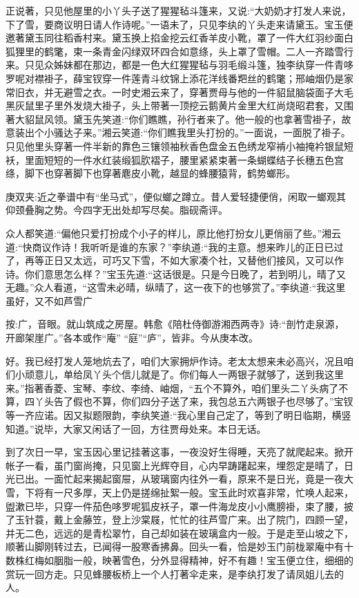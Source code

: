 \begin{parag}
    正说著，只见他屋里的小丫头子送了猩猩毡斗篷来，又说:“大奶奶才打发人来说，下了雪，要商议明日请人作诗呢。”一语未了，只见李纨的丫头走来请黛玉。宝玉便邀著黛玉同往稻香村来。黛玉换上掐金挖云红香羊皮小靴，罩了一件大红羽纱面白狐狸里的鹤氅，束一条青金闪绿双环四合如意绦，头上罩了雪帽。二人一齐踏雪行来。只见众姊妹都在那边，都是一色大红猩猩毡与羽毛缎斗篷，独李纨穿一件青哆罗呢对襟褂子，薛宝钗穿一件莲青斗纹锦上添花洋线番羓丝的鹤氅；邢岫烟仍是家常旧衣，并无避雪之衣。一时史湘云来了，穿著贾母与他的一件貂鼠脑袋面子大毛黑灰鼠里子里外发烧大褂子，头上带著一顶挖云鹅黄片金里大红尚烧昭君套，又围著大貂鼠风领。黛玉先笑道:“你们瞧瞧，孙行者来了。他一般的也拿著雪褂子，故意装出个小骚达子来。”湘云笑道:“你们瞧我里头打扮的。”一面说，一面脱了褂子。只见他里头穿著一件半新的靠色三镶领袖秋香色盘金五色绣龙窄褃小袖掩衿银鼠短袄，里面短短的一件水红装缎狐肷褶子，腰里紧紧束著一条蝴蝶结子长穗五色宫绦，脚下也穿著脚下也穿著麀皮小靴，越显的蜂腰猿背，鹤势螂形。\begin{note}庚双夹:近之拳谱中有“坐马式”，便似螂之蹲立。昔人爱轻捷便俏，闲取一螂观其仰颈叠胸之势。今四字无出处却写尽矣。脂砚斋评。\end{note}众人都笑道:“偏他只爱打扮成个小子的样儿，原比他打扮女儿更俏丽了些。”湘云道:“快商议作诗！我听听是谁的东家？”李纨道:“我的主意。想来昨儿的正日已过了，再等正日又太远，可巧又下雪，不如大家凑个社，又替他们接风，又可以作诗。你们意思怎么样？”宝玉先道:“这话很是。只是今日晚了，若到明儿，晴了又无趣。”众人看道，“这雪未必晴，纵晴了，这一夜下的也够赏了。”李纨道:“我这里虽好，又不如芦雪广 \begin{subnote}按:广，音眼。就山筑成之房屋。韩愈《陪杜侍御游湘西两寺》诗:“剖竹走泉源，开廊架崖广。”各本或作“庵” “庭”“庐”，皆非。今从庚本改。\end{subnote}好。我已经打发人笼地炕去了，咱们大家拥炉作诗。老太太想来未必高兴，况且咱们小顽意儿，单给凤丫头个信儿就是了。你们每人一两银子就够了，送到我这里来。”指著香菱、宝琴、李纹、李绮、岫烟，“五个不算外，咱们里头二丫头病了不算，四丫头告了假也不算，你们四分子送了来，我包总五六两银子也尽够了。”宝钗等一齐应诺。因又拟题限韵，李纨笑道:“我心里自己定了，等到了明日临期，横竖知道。”说毕，大家又闲话了一回，方往贾母处来。本日无话。
\end{parag}


\begin{parag}
    到了次日一早，宝玉因心里记挂著这事，一夜没好生得睡，天亮了就爬起来。掀开帐子一看，虽门窗尚掩，只见窗上光辉夺目，心内早踌躇起来，埋怨定是晴了，日光已出。一面忙起来揭起窗屉，从玻璃窗内往外一看，原来不是日光，竟是一夜大雪，下将有一尺多厚，天上仍是搓绵扯絮一般。宝玉此时欢喜非常，忙唤人起来，盥漱已毕，只穿一件茄色哆罗呢狐皮袄子，罩一件海龙皮小小鹰膀褂，束了腰，披了玉针蓑，戴上金藤笠，登上沙棠屐，忙忙的往芦雪广来。出了院门，四顾一望，并无二色，远远的是青松翠竹，自己却如装在玻璃盒内一般。于是走至山坡之下，顺著山脚刚转过去，已闻得一股寒香拂鼻。回头一看，恰是妙玉门前栊翠庵中有十数株红梅如胭脂一般，映著雪色，分外显得精神，好不有趣！宝玉便立住，细细的赏玩一回方走。只见蜂腰板桥上一个人打著伞走来，是李纨打发了请凤姐儿去的人。
\end{parag}


